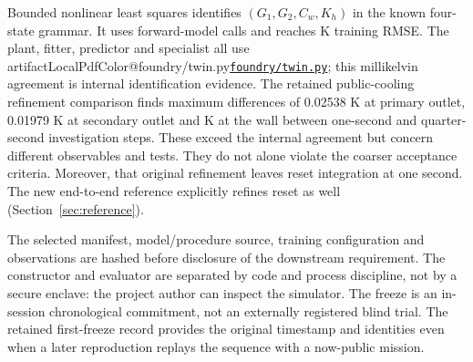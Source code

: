 \documentclass[11pt,letterpaper]{article}
\makeatletter
\newcommand{\artifact}[1]{\begingroup\ifcsname artifactLocalPdfColor@#1\endcsname\hypersetup{urlcolor=cyan}\fi\href{\csname artifacturl@#1\endcsname}{\nolinkurl{#1}}\endgroup}
\makeatother
\begin{document}
Bounded nonlinear least squares identifies $(G_1,G_2,C_w,K_h)$ in the known four-state grammar. It uses \FitCalls{} forward-model calls and reaches \FitRMSE{} K training RMSE. The plant, fitter, predictor and specialist all use \artifact{foundry/twin.py}; this millikelvin agreement is internal identification evidence. The retained public-cooling refinement comparison finds maximum differences of 0.02538 K at primary outlet, 0.01979 K at secondary outlet and \NumericalWallError{} K at the wall between one-second and quarter-second investigation steps. These exceed the internal agreement but concern different observables and tests. They do not alone violate the coarser acceptance criteria. Moreover, that original refinement leaves reset integration at one second. The new end-to-end reference explicitly refines reset as well (Section~\ref{sec:reference}).

The selected manifest, model/procedure source, training configuration and observations are hashed before disclosure of the downstream requirement. The constructor and evaluator are separated by code and process discipline, not by a secure enclave: the project author can inspect the simulator. The freeze is an in-session chronological commitment, not an externally registered blind trial. The retained first-freeze record provides the original timestamp and identities even when a later reproduction replays the sequence with a now-public mission.
\end{document}
